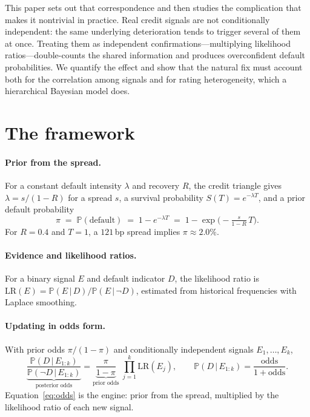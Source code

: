 \documentclass[11pt]{article}
\newcommand{\PR}{\mathbb{P}}
\newcommand{\given}{\,\vert\,}
\newcommand{\LR}{\mathrm{LR}}
\newcommand{\odds}{\mathrm{odds}}
\begin{document}
This paper sets out that correspondence and then studies the complication that makes
it nontrivial in practice. Real credit signals are not conditionally independent:
the same underlying deterioration tends to trigger several of them at once. Treating
them as independent confirmations---multiplying likelihood ratios---double-counts the
shared information and produces overconfident default probabilities. We quantify the
effect and show that the natural fix must account both for the correlation among
signals and for rating heterogeneity, which a hierarchical Bayesian model does.

\section{The framework}
\paragraph{Prior from the spread.}
For a constant default intensity $\lambda$ and recovery $R$, the credit triangle gives
$\lambda = s/(1-R)$ for a spread $s$, a survival probability $S(T)=e^{-\lambda T}$,
and a prior default probability
\begin{equation}
\pi \;=\; \PR(\text{default})\;=\;1-e^{-\lambda T}
       \;=\;1-\exp\!\Big(-\tfrac{s}{1-R}\,T\Big).
\end{equation}
For $R=0.4$ and $T=1$, a $121$\,bp spread implies $\pi\approx 2.0\%$.

\paragraph{Evidence and likelihood ratios.}
For a binary signal $E$ and default indicator $D$, the likelihood ratio is
$\LR(E)=\PR(E\given D)/\PR(E\given \lnot D)$, estimated from historical frequencies
with Laplace smoothing.

\paragraph{Updating in odds form.}
With prior odds $\pi/(1-\pi)$ and conditionally independent signals $E_1,\dots,E_k$,
\begin{equation}\label{eq:odds}
\underbrace{\frac{\PR(D\given E_{1:k})}{\PR(\lnot D\given E_{1:k})}}_{\text{posterior odds}}
=\underbrace{\frac{\pi}{1-\pi}}_{\text{prior odds}}\;\prod_{j=1}^{k}\LR(E_j),
\qquad
\PR(D\given E_{1:k})=\frac{\odds}{1+\odds}.
\end{equation}
Equation~\eqref{eq:odds} is the engine: prior from the spread, multiplied by the
likelihood ratio of each new signal.
\end{document}
